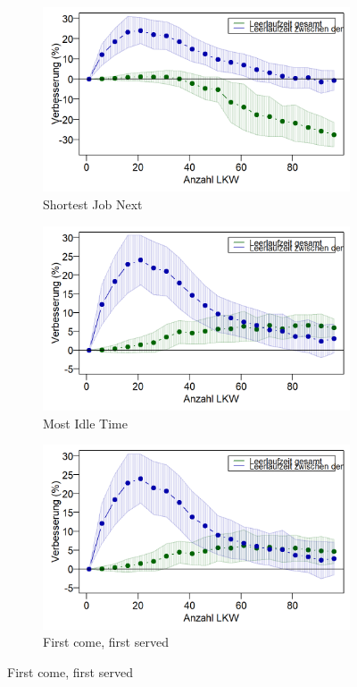\begin{figure}[H]
\centering
\begin{subfigure}{.495\textwidth}
  \centering
  \includegraphics[width=\linewidth]{images/graphs/rsNumberOfTrucksSjn_Leerlaufzeit.png}
  \caption{Shortest Job Next}
  \label{fig:el1}
\end{subfigure}
\begin{subfigure}{.495\textwidth}
  \centering
  \includegraphics[width=\linewidth]{images/graphs/rsNumberOfTrucksMot_Leerlaufzeit.png}
  \caption{Most Idle Time}
  \label{fig:el2}
\end{subfigure}

\begin{subfigure}{.5\textwidth}
  \centering
  \includegraphics[width=\linewidth]{images/graphs/rsNumberOfTrucksFcfs_Leerlaufzeit.png}
  \caption{First come, first served}
  \label{fig:el3}
\end{subfigure}


\end{figure}
